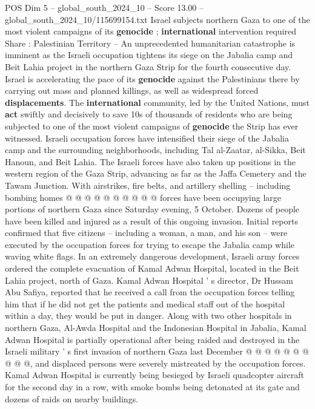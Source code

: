 \begin{textsample}{POS Dim 5 – global\_south\_2024\_10 – Score 13.00 – global\_south\_2024\_10/115699154.txt}  \label{ex:f5_pos_349}
Israel subjects northern Gaza to one of the most violent campaigns of its \textbf{genocide} ; \textbf{international} intervention required Share : Palestinian Territory -- An unprecedented humanitarian catastrophe is imminent as the Israeli occupation tightens its siege on the Jabalia camp and Beit Lahia project in the northern Gaza Strip for the fourth consecutive day.
Israel is accelerating the pace of its \textbf{genocide} against the Palestinians there by carrying out mass and planned killings, as well as widespread forced \textbf{displacements}.
The \textbf{international} community, led by the United Nations, must \textbf{act} swiftly and decisively to save 10s of thousands of residents who are being subjected to one of the most violent campaigns of \textbf{genocide} the Strip has ever witnessed.
Israeli occupation forces have intensified their siege of the Jabalia camp and the surrounding neighborhoods, including Tal al-Zaatar, al-Sikka, Beit Hanoun, and Beit Lahia.
The Israeli forces have also taken up positions in the western region of the Gaza Strip, advancing as far as the Jaffa Cemetery and the Tawam Junction.
With airstrikes, fire belts, and artillery shelling -- including bombing homes @ @ @ @ @ @ @ @ @ @ forces have been occupying large portions of northern Gaza since Saturday evening, 5 October.
Dozens of people have been killed and injured as a result of this ongoing invasion.
Initial reports confirmed that five citizens -- including a woman, a man, and his son -- were executed by the occupation forces for trying to escape the Jabalia camp while waving white flags.
In an extremely dangerous development, Israeli army forces ordered the complete evacuation of Kamal Adwan Hospital, located in the Beit Lahia project, north of Gaza.
Kamal Adwan Hospital ' s director, Dr Hussam Abu Safiya, reported that he received a call from the occupation forces telling him that if he did not get the patients and medical staff out of the hospital within a day, they would be put in danger.
Along with two other hospitals in northern Gaza, Al-Awda Hospital and the Indonesian Hospital in Jabalia, Kamal Adwan Hospital is partially operational after being raided and destroyed in the Israeli military ' s first invasion of northern Gaza last December @ @ @ @ @ @ @ @ @ @, and displaced persons were severely mistreated by the occupation forces.
Kamal Adwan Hospital is currently being besieged by Israeli quadcopter aircraft for the second day in a row, with smoke bombs being detonated at its gate and dozens of raids on nearby buildings.

\end{textsample}
